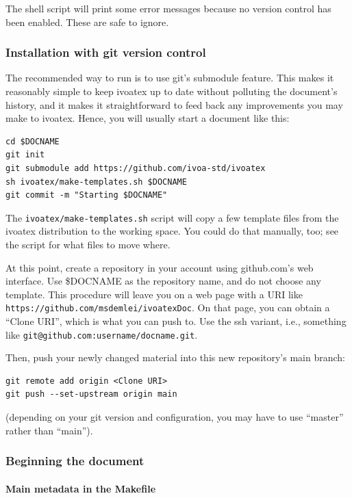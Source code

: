 \documentclass[11pt,a4paper]{ivoa}
\begin{document}
The shell script will print some error messages because no version
control has been enabled.  These are safe to ignore.

\subsubsection{Installation with git version control}

The recommended way to run \ivoatex{}
is to use git's submodule feature.  This makes it reasonably simple to keep
ivoatex up to date without polluting the
document's history, and it makes it straightforward to
feed back any improvements you may make to ivoatex.  Hence, you will
usually start a document like this:

\begin{lstlisting}[basicstyle=\footnotesize]
cd $DOCNAME
git init
git submodule add https://github.com/ivoa-std/ivoatex
sh ivoatex/make-templates.sh $DOCNAME
git commit -m "Starting $DOCNAME"
\end{lstlisting}

The \verb|ivoatex/make-templates.sh| script will copy a few template files from
the ivoatex distribution to the working space.  You could do that
manually, too; see the script for what files to move where.

At this point, create a repository in your account using github.com's web
interface. Use \$DOCNAME as the repository name, and do not choose any
template. This procedure will leave you on a web page with a URI like
\nolinkurl{https://github.com/msdemlei/ivoatexDoc}.
On that page, you can obtain a
``Clone URI'', which is what you can push to.  Use the ssh variant,
i.e., something like \verb|git@github.com:username/docname.git|.

Then, push your newly changed material into this new repository's main
branch:
\begin{lstlisting}[basicstyle=\footnotesize]
git remote add origin <Clone URI>
git push --set-upstream origin main
\end{lstlisting}
(depending on your git version and configuration,
you may have to use ``master'' rather
than ``main'').

\subsubsection{Beginning the document}
\label{sect:beginning}

\paragraph{Main metadata in the Makefile}
\label{sect:mainmeta}
\end{document}
